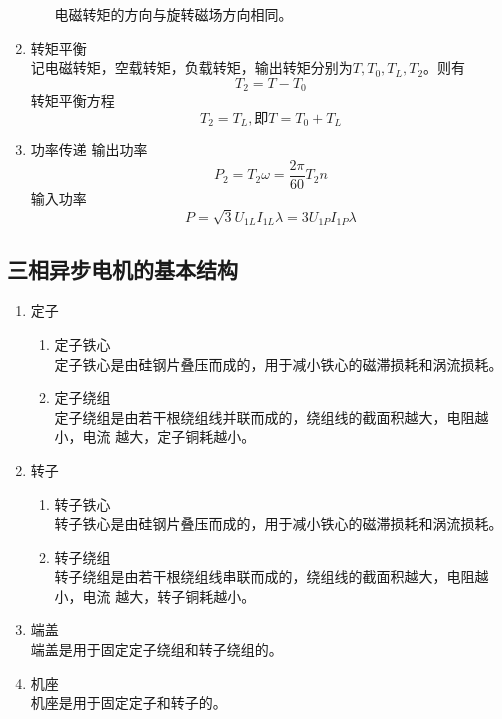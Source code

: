 \begin{enumerate}
\begin{enumerate}
        电磁转矩的方向与旋转磁场方向相同。
    \end{enumerate}
    \item 转矩平衡 \\
    记电磁转矩，空载转矩，负载转矩，输出转矩分别为$T,T_0,T_L,T_2$。则有
    \begin{equation}
        T_2=T-T_0
    \end{equation}
    转矩平衡方程
    \begin{equation}
        T_2=T_L,\text{即} T=T_0+T_L
    \end{equation}
    \item 功率传递
    输出功率
    \begin{equation}
        P_2=T_2\omega=\frac{2\pi}{60}T_2n
    \end{equation}
    输入功率
    \begin{equation}
        P=\sqrt{3}U_{1L}I_{1L}\lambda=3U_{1P}I_{1P}\lambda
    \end{equation}
\end{enumerate}

\subsection{三相异步电机的基本结构}

\begin{enumerate}
    \item 定子
    \begin{enumerate}
        \item 定子铁心\\
        定子铁心是由硅钢片叠压而成的，用于减小铁心的磁滞损耗和涡流损耗。
        \item 定子绕组\\
        定子绕组是由若干根绕组线并联而成的，绕组线的截面积越大，电阻越小，电流
        越大，定子铜耗越小。
    \end{enumerate}
    \item 转子
    \begin{enumerate}
        \item 转子铁心\\
        转子铁心是由硅钢片叠压而成的，用于减小铁心的磁滞损耗和涡流损耗。
        \item 转子绕组\\
        转子绕组是由若干根绕组线串联而成的，绕组线的截面积越大，电阻越小，电流
        越大，转子铜耗越小。
    \end{enumerate}
    \item 端盖\\
    端盖是用于固定定子绕组和转子绕组的。
    \item 机座\\
    机座是用于固定定子和转子的。
\end{enumerate}

